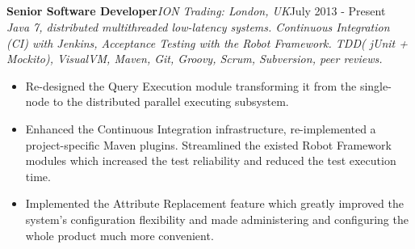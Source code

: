 \documentclass{res}
\newcommand{\jobdes}[4]{\needspace{3\baselineskip}%
{\noindent \bf #3\hspace{2ex}}{{\em \small #1}}{\hfill #2}\\{{\it \small #4.}}}
\newcommand{\osection}[1]{\section{\sc {\Large \textbf{#1}\\}} \vspace{0.30cm}}
\begin{document}
\begin{resume}
\osection{Career History}
\jobdes{ION Trading: London, UK} {July 2013 - Present}{Senior Software Developer}
{Java 7, distributed multithreaded low-latency systems. Continuous Integration (CI) with Jenkins, Acceptance Testing with the Robot Framework. TDD( jUnit + Mockito), VisualVM, Maven, Git, Groovy, Scrum, Subversion, peer reviews}
\begin{itemize}
 \item Re-designed the Query Execution module transforming it from the single-node to the distributed parallel executing subsystem.
 \item Enhanced the Continuous Integration infrastructure, re-implemented a project-specific Maven plugins. Streamlined the existed Robot Framework modules which increased the test reliability and reduced the test execution time.
 \item Implemented the Attribute Replacement feature which greatly improved the system’s configuration flexibility and made administering and configuring the whole product much more convenient.
 \end{itemize}


\end{resume}
\end{document}
